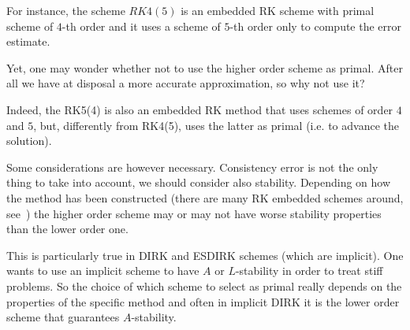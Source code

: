 \documentclass[10pt,a4paper,twoside]{article}
\begin{document}
For instance, the scheme $RK4(5)$ is an embedded RK scheme with primal scheme of $4$-th order and it uses a scheme of $5$-th order only to compute the error estimate.

Yet, one may wonder whether not to use the higher order scheme as primal. After all we have at disposal a more accurate approximation, so why not use it?

Indeed, the RK5(4) is also an embedded RK method that uses schemes of order $4$ and $5$, but, differently from RK4(5), uses the latter as primal (i.e. to advance the solution).

Some considerations are however necessary. Consistency error is not the only thing to take into account, we should consider also stability. Depending on how the method has been constructed (there are many RK embedded schemes around, see~\cite{RungeKuttaMethods2016}) the higher order scheme may or may not have worse stability properties than the lower order one.

This is particularly true in DIRK and ESDIRK schemes (which are implicit). One wants to use an implicit scheme to have $A$ or $L$-stability in order to treat stiff problems. So the choice of which scheme to select as primal really depends on the properties of the specific method and often in implicit DIRK it is the lower order scheme that guarantees $A$-stability.




\end{document}
